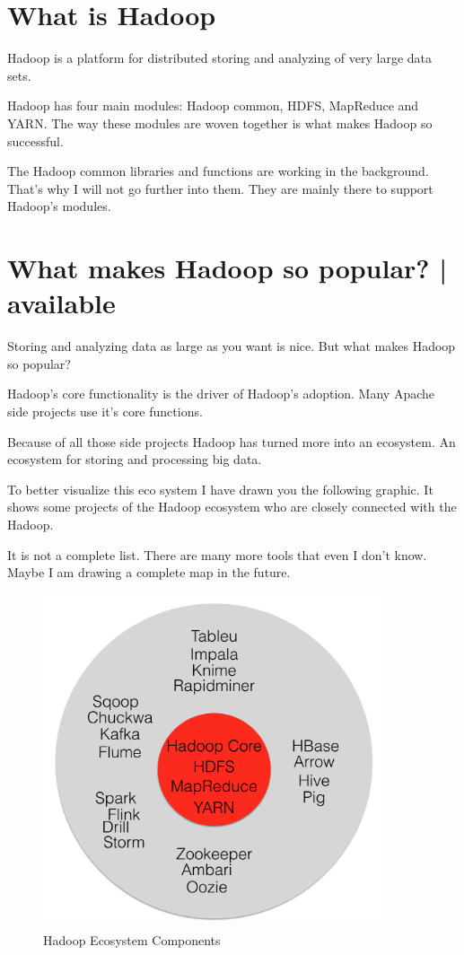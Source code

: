 \documentclass[12pt, numbers=noenddot]{scrreprt} %
\begin{document}
\section{What is Hadoop}

Hadoop is a platform for distributed storing and analyzing of very large data sets.

Hadoop has four main modules: Hadoop common, HDFS, MapReduce and YARN. The way these modules are woven together is what makes Hadoop so successful.

The Hadoop common libraries and functions are working in the background. That’s why I will not go further into them. They are mainly there to support Hadoop’s modules.

\section{What makes Hadoop so popular? | available}
Storing and analyzing data as large as you want is nice. But what makes Hadoop so popular?

Hadoop’s core functionality is the driver of Hadoop’s adoption. Many Apache side projects use it’s core functions.

Because of all those side projects Hadoop has turned more into an ecosystem. An ecosystem for storing and processing big data.

To better visualize this eco system I have drawn you the following graphic. It shows some projects of the Hadoop ecosystem who are closely connected with the Hadoop.

It is not a complete list. There are many more tools that even I don’t know. Maybe I am drawing a complete map in the future.

\begin{figure}[htbp]
  \centering
     \includegraphics[width=0.9\textwidth]{images/Hadoop-Ecosystem.png}
  \caption{Hadoop Ecosystem Components}
  \label{fig:Bild1}
\end{figure}
\end{document}
